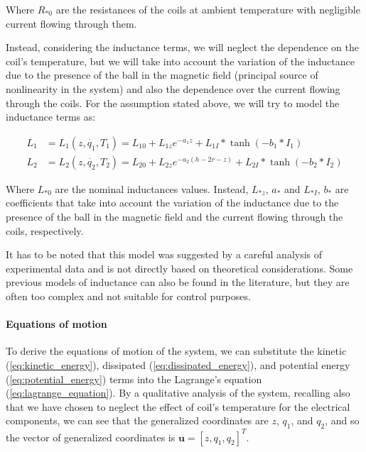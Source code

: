 Where $R_{*0}$ are the resistances of the coils at ambient temperature with negligible current flowing through them.

Instead, considering the inductance terms, we will neglect the dependence on the coil's temperature, but we will take into account the variation of the inductance due to the presence of the ball in the magnetic field (principal source of nonlinearity in the system) and also the dependence over the current flowing through the coils.
For the assumption stated above, we will try to model the inductance terms as:

\begin{equation}
    \begin{aligned}
        L_1 & = L_1(z, \dot{q_1}, T_1) = L_{10} + L_{1z} e^{-a_1 z} + L_{1I} * \tanh(-b_1 * I_{1})            \\
        L_2 & = L_2(z, \dot{q_2}, T_2) = L_{20} + L_{2z} e^{-a_2 (h - 2r - z)} + L_{2I} * \tanh(-b_2 * I_{2})
    \end{aligned}
    \label{eq:model_for_inductance}
\end{equation}

Where $L_{*0}$ are the nominal inductances values. Instead, $L_{*z}$, $a_*$ and $L_{*I}$, $b_*$ are coefficients that take into account the variation of the inductance due to the presence of the ball in the magnetic field and the current flowing through the coils, respectively.

It has to be noted that this model was suggested by a careful analysis of experimental data and is not directly based on theoretical considerations.
Some previous models of inductance can also be found in the literature, but they are often too complex and not suitable for control purposes.

\paragraph{Equations of motion}

To derive the equations of motion of the system, we can substitute the kinetic (\ref{eq:kinetic_energy}), dissipated (\ref{eq:dissipated_energy}), and potential energy (\ref{eq:potential_energy}) terms into the Lagrange's equation (\ref{eq:lagrange_equation}).
By a qualitative analysis of the system, recalling also that we have chosen to neglect the effect of coil's temperature for the electrical components, we can see that the generalized coordinates are $z$, $q_1$, and $q_2$, and so the vector of generalized coordinates is $\mathbf{u} = [z, q_1, q_2]^T$.

